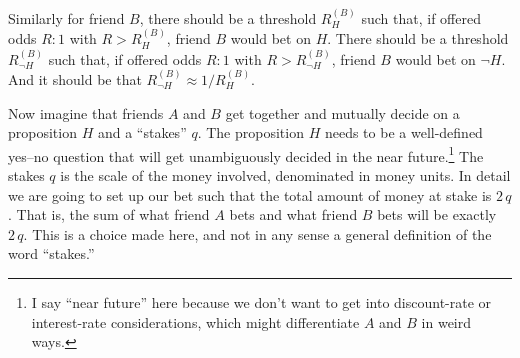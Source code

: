 \documentclass{article}
\renewcommand{\not}{\neg}
\begin{document}
Similarly for friend $B$, there should be a threshold $R_H^{(B)}$ such that, if offered odds $R:1$ with $R>R_H^{(B)}$, friend $B$ would bet on $H$.
There should be a threshold $R_{\not H}^{(B)}$ such that, if offered odds $R:1$ with $R>R_{\not H}^{(B)}$, friend $B$
would bet on $\not H$.
And it should be that $R_{\not H}^{(B)} \approx 1/R_H^{(B)}$.

Now imagine that friends $A$ and $B$ get together and mutually decide on a proposition $H$ and a ``stakes'' $q$.
The proposition $H$ needs to be a well-defined yes--no question that will get unambiguously decided in the near future.\footnote{%
I say ``near future'' here because we don't want to get into discount-rate or interest-rate considerations,
which might differentiate $A$ and $B$ in weird ways.}
The stakes $q$ is the scale of the money involved, denominated in money units.
In detail we are going to set up our bet such that the total amount of money at stake is $2\,q$.
That is, the sum of what friend $A$ bets and what friend $B$ bets will be exactly $2\,q$.
This is a choice made here, and not in any sense a general definition of the word ``stakes.''
\end{document}

